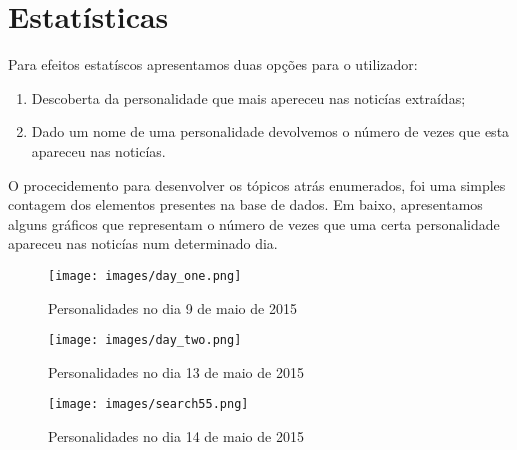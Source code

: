 \section{Estatísticas}

Para efeitos estatíscos apresentamos duas opções para o utilizador:

\begin{enumerate}
  \item Descoberta da personalidade que mais apereceu nas noticías extraídas;
  \item Dado um nome de uma personalidade devolvemos o número de vezes que esta apareceu nas noticías.
\end{enumerate}

O procecidemento para desenvolver os tópicos atrás enumerados, foi uma simples contagem dos elementos presentes na base de dados. Em baixo, apresentamos alguns gráficos que representam o número de vezes que uma certa personalidade apareceu nas noticías num determinado dia.

\begin{figure}[htbp]
  \centering
    \texttt{[image: images/day\_one.png]}
	\caption{Personalidades no dia 9 de maio de 2015}
\end{figure}

\begin{figure}[htbp]
  \centering
    \texttt{[image: images/day\_two.png]}
	\caption{Personalidades no dia 13 de maio de 2015}
\end{figure}

\begin{figure}[htbp]
    \centering
    \texttt{[image: images/search55.png]} %
    \caption{Personalidades no dia 14 de maio de 2015}
\end{figure}

